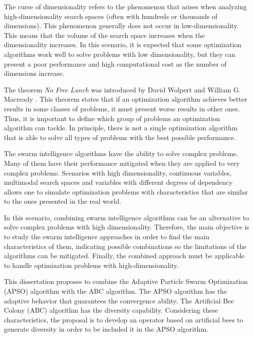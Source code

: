 The curse of dimensionality refers to the phenomenon that arises when analyzing
high-dimensionality search spaces (often with hundreds or thousands of
dimensions). This phenomenon generally does not occur in low-dimensionality.
This means that the volume of the search space increases when the
dimensionality increases. In this scenario, it is expected that some optimization algorithms work well to solve
problems with low dimensionality, but they can present a poor performance and high computational cost as the number of dimensions increase.

The theorem \emph{No Free Lunch} was introduced by David Wolpert and William G.
Macready \cite{SI:Wolpert1995}. This theorem states that if an optimization
algorithm achieves better results in some classes of problems, it must present worse
results in other ones. Thus, it is important to define which group of
problems an optimization algorithm can tackle. In principle, there is not a single
optimization algorithm that is able to solve all types of problems with the best possible performance.

The swarm intelligence algorithms have the ability to solve complex problems.
Many of them have their performance mitigated when they are applied to very complex problems. Scenarios with high
dimensionality, continuous variables, multimodal search spaces and variables with different degrees of
dependency allows one to simulate optimization problems with characteristics that are similar to the ones presented in the real world.

In this scenario, combining swarm intelligence algorithms can be an
alternative to solve complex problems with high dimensionality. Therefore, the main objective is to study the swarm intelligence approaches in order
to find the main characteristics of them, indicating possible combinations so
the limitations of the algorithms can be mitigated. Finally, the combined
approach must be applicable to handle optimization problems with high-dimensionality.

This dissertation proposes to combine the Adaptive Particle Swarm Optimization (APSO) algorithm with the ABC algorithm. The APSO algorithm has the adaptive behavior that guarantees the convergence ability. The Artificial Bee Colony (ABC) algorithm has the diversity capability. Considering these characteristics, the proposal is to develop an operator based on artificial bees to generate diversity in order to be included it in the APSO algorithm.

